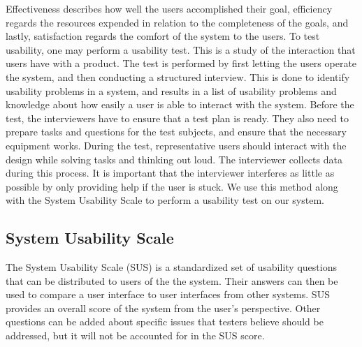 Effectiveness describes how well the users accomplished their goal, efficiency regards the resources expended in relation to the completeness of the goals, and lastly, satisfaction regards the comfort of the system to the users.
To test usability, one may perform a usability test. This is a study of the interaction that users have with a product. The test is performed by first letting the users operate the system, and then conducting a structured interview. This is done to identify usability problems in a system, and results in a list of usability problems and knowledge about how easily a user is able to interact with the system.
Before the test, the interviewers have to ensure that a test plan is ready.
They also need to prepare tasks and questions for the test subjects, and ensure that the necessary equipment works.
During the test, representative users should interact with the design while solving tasks and thinking out loud. The interviewer collects data during this process. It is important that the interviewer interferes as little as possible by only providing help if the user is stuck.
\cite{deb7} We use this method along with the System Usability Scale to perform a usability test on our system.

\subsection{System Usability Scale} \label{sec:SUSScore}
The System Usability Scale (SUS) is a standardized set of usability questions that can be distributed to users of the the system.
Their answers can then be used to compare a user interface to user interfaces from other systems.
SUS provides an overall score of the system from the user's perspective.
Other questions can be added about specific issues that testers believe should be addressed, but it will not be accounted for in the SUS score.\cite{adobeSUS}


